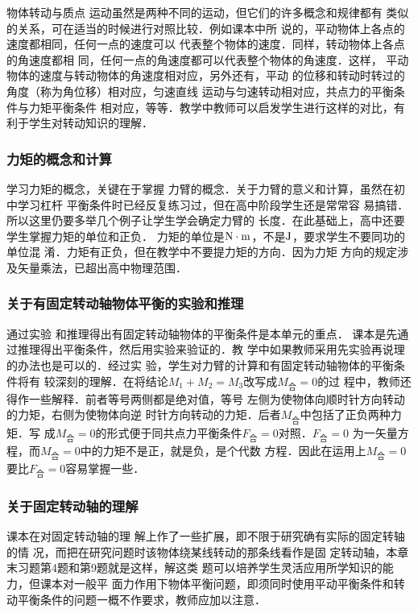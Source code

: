 物体转动与质点
运动虽然是两种不同的运动，但它们的许多概念和规律都有
类似的关系，可在适当的时候进行对照比较．例如课本中所
说的，平动物体上各点的速度都相同，任何一点的速度可以
代表整个物体的速度．同样，转动物体上各点的角速度都相
同，任何一点的角速度都可以代表整个物体的角速度．这样，
平动物体的速度与转动物体的角速度相对应，另外还有，平动
的位移和转动时转过的角度（称为角位移）相对应，匀速直线
运动与匀速转动相对应，共点力的平衡条件与力矩平衡条件
相对应，等等．教学中教师可以启发学生进行这样的对比，有
利于学生对转动知识的理解．

\subsubsection{力矩的概念和计算}
学习力矩的概念，关键在于掌握
力臂的概念．关于力臂的意义和计算，虽然在初中学习杠杆
平衡条件时已经反复练习过，但在高中阶段学生还是常常容
易搞错．所以这里仍要多举几个例子让学生学会确定力臂的
长度．在此基础上，高中还要学生掌握力矩的单位和正负．
力矩的单位是${\rm N\cdot m}$，不是${\rm J}$，要求学生不要同功的单位混
淆．力矩有正负，但在教学中不要提力矩的方向．因为力矩
方向的规定涉及矢量乘法，已超出高中物理范围．

\subsubsection{关于有固定转动轴物体平衡的实验和推理}

通过实验
和推理得出有固定转动轴物体的平衡条件是本单元的重点．
课本是先通过推理得出平衡条件，然后用实验来验证的．教
学中如果教师采用先实验再说理的办法也是可以的．经过实
验，学生对力臂的计算和有固定转动轴物体的平衡条件将有
较深刻的理解．在将结论$M_1+M_2=M_3$改写成$M_{\text{合}}=0$的过
程中，教师还得作一些解释．前者等号两侧都是绝对值，等号
左侧为使物体向顺时针方向转动的力矩，右侧为使物体向逆
时针方向转动的力矩．后者$M_{\text{合}}$中包括了正负两种力矩．写
成$M_{\text{合}}=0$的形式便于同共点力平衡条件$F_{\text{合}}=0$对照．$F_{\text{合}}=0$
为一矢量方程，而$M_{\text{合}}=0$中的力矩不是正，就是负，是个代数
方程．因此在运用上$M_{\text{合}}=0$要比$F_{\text{合}}=0$容易掌握一些．

\subsubsection{关于固定转动轴的理解}

课本在对固定转动轴的理
解上作了一些扩展，即不限于研究确有实际的固定转轴的情
况，而把在研究问题时该物体绕某线转动的那条线看作是固
定转动轴，本章末习题第4题和第9题就是这样，解这类
题可以培养学生灵活应用所学知识的能力，但课本对一般平
面力作用下物体平衡问题，即须同时使用平动平衡条件和转
动平衡条件的问题一概不作要求，教师应加以注意．

